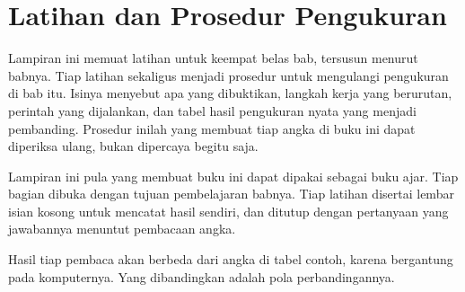 \chapter{Latihan dan Prosedur Pengukuran}
\label{ch:latihan}

Lampiran ini memuat latihan untuk keempat belas bab, tersusun menurut babnya.
Tiap latihan sekaligus menjadi prosedur untuk mengulangi pengukuran di bab
itu. Isinya menyebut apa yang dibuktikan, langkah kerja yang berurutan,
perintah yang dijalankan, dan tabel hasil pengukuran nyata yang menjadi
pembanding. Prosedur inilah yang membuat tiap angka di buku ini dapat
diperiksa ulang, bukan dipercaya begitu saja.

Lampiran ini pula yang membuat buku ini dapat dipakai sebagai buku ajar. Tiap
bagian dibuka dengan tujuan pembelajaran babnya. Tiap latihan disertai lembar
isian kosong untuk mencatat hasil sendiri, dan ditutup dengan pertanyaan yang
jawabannya menuntut pembacaan angka.

Hasil tiap pembaca akan berbeda dari angka di tabel contoh, karena
bergantung pada komputernya. Yang dibandingkan adalah pola perbandingannya.















